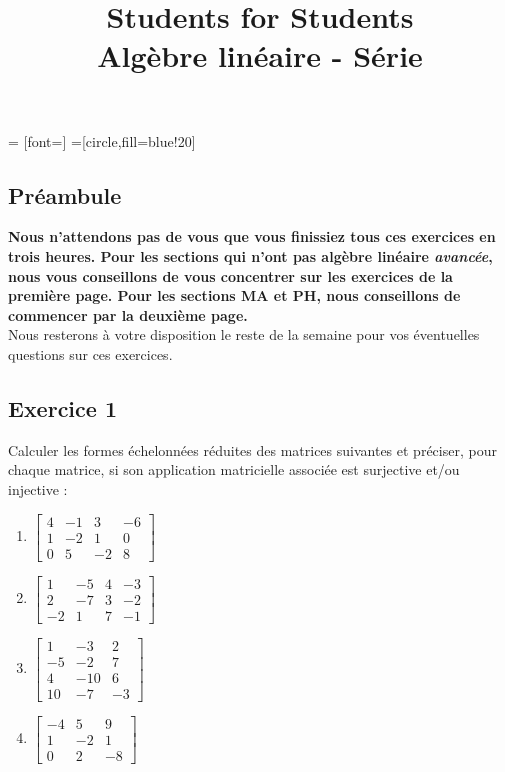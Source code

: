 \documentclass{article}
\title{Students for Students \\Algèbre linéaire - Série}
\author{}
\date{}
\begin{document}
 = [font=\scriptsize]  
=[circle,fill=blue!20]

\maketitle

\subsection*{Préambule}
\textbf{Nous n'attendons pas de vous que vous finissiez tous ces exercices en trois heures. Pour les sections qui n'ont pas algèbre linéaire \textit{avancée}, nous vous conseillons de vous concentrer sur les exercices de la première page. Pour les sections MA et PH, nous conseillons de commencer par la deuxième page.}\\
Nous resterons à votre disposition le reste de la semaine pour vos éventuelles questions sur ces exercices.

\subsection*{Exercice 1}
\noindent Calculer les formes échelonnées réduites des matrices suivantes et préciser, pour chaque matrice, si son application matricielle associée est surjective et/ou injective :
\begin{multicols}{2}
\begin{enumerate}
    \item $\begin{bmatrix}
    4 & -1 & 3 & -6\\
    1 & -2 & 1 & 0\\
    0 & 5 & -2 & 8
    \end{bmatrix}$
    \item $\begin{bmatrix}
    1 & -5 & 4 & -3\\
    2 & -7 & 3 & -2\\
    -2 & 1 & 7 & -1
    \end{bmatrix}$ \\
    \item $\begin{bmatrix}
    1 & -3 & 2 \\
    -5 & -2  & 7  \\
    4 & -10  & 6 \\
    10 & -7 & -3
    \end{bmatrix}$
    \item $\begin{bmatrix}
    -4 & 5 & 9\\
    1 & -2 & 1\\
    0 & 2 & -8 
    \end{bmatrix}$
\end{enumerate}
\end{multicols}
\end{document}
